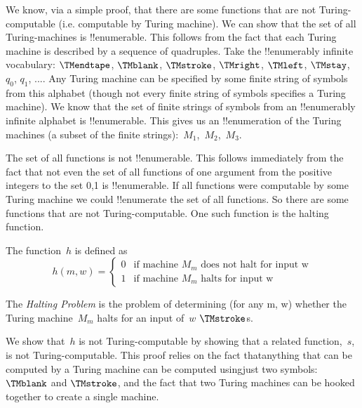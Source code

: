\documentclass[../../include/open-logic-section]{subfiles}
\begin{document}

\begin{explain}
We know, via a simple proof, that there are some functions that are not
Turing-computable (i.e. computable by Turing machine).
We can show that the set of all Turing-machines is !!{enumerable}. This
follows from the fact that each Turing machine is described by a sequence
of quadruples. Take the !!{enumerably} infinite vocabulary: $\TMendtape$,
$\TMblank$, $\TMstroke$, $\TMright$, $\TMleft$, $\TMstay$, $q_0$,
$q_1$, .... Any Turing machine
can be specified by some finite string of symbols from this alphabet
(though not every finite string of symbols specifies a Turing machine). We
know that the set of finite strings of symbols from an !!{enumerably} infinite
alphabet is !!{enumerable}. This gives us an !!{enumeration} of the Turing
machines (a subset of the finite strings):~$M_1$,~$M_2$,~$M_3$.

The set of all functions is not !!{enumerable}. This follows immediately from
the fact that not even the set of all functions of one argument from the
positive integers to the set {0,1} is !!{enumerable}.
If all functions were computable by some Turing machine we could !!{enumerate}
the set of all functions. So there are some functions that are not
Turing-computable. One such function is the halting function.
\end{explain}

\begin{defn} The function~$h$ is defined as
\[
h(m,w) =
\begin{cases}
  \text{0} & \text{if machine~$M_m$ does not halt for input w} \\
  \text{1} & \text{if machine~$M_m$ halts for input w}
\end{cases}
\]
\end{defn}

\begin{defn}
The \emph{Halting Problem} is the problem of determining (for any m, w)
whether the Turing machine~$M_m$ halts for an input of~$w$ $\TMstroke$s.
\end{defn}

\begin{explain}
We show that~$h$ is not Turing-computable by showing that a related
function,~$s$, is not Turing-computable. This proof relies on the fact
thatanything that can be computed by a Turing machine can be computed
usingjust two symbols: $\TMblank$ and $\TMstroke$, and the fact that two
Turing machines can be hooked together to create a single machine.
\end{explain}
\end{document}
